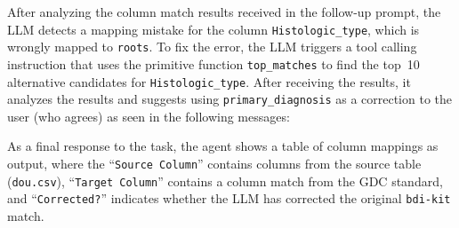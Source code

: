 After analyzing the column match results received in the follow-up prompt, the LLM detects a mapping mistake for the column \texttt{Histologic\_type}, which is wrongly mapped to \texttt{roots}. To fix the error, the LLM triggers a tool calling instruction that uses the primitive function \texttt{top\_matches} to find the top~10 alternative candidates for \texttt{Histologic\_type}. After receiving the results, it analyzes the results and suggests using \texttt{primary\_diagnosis} as a correction to the user (who agrees) as seen in the following messages:

\vbox{
}
\vspace{-.5em}
\noindent 
As a final response to the task, the agent shows a table of column mappings as output, where the ``\texttt{Source Column}'' contains columns from the source table (\texttt{dou.csv}), ``\texttt{Target Column}'' contains a column match from the GDC standard, and ``\texttt{Corrected?}'' indicates whether the LLM has corrected the original \texttt{bdi-kit} match.

\vspace{-.25em}

